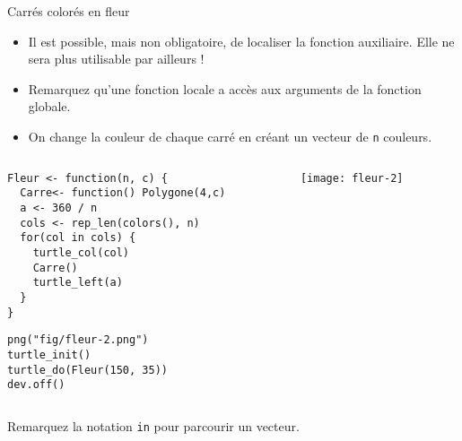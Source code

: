 \documentclass[10pt]{beamer}
\begin{document}
\begin{frame}[fragile]{Carrés colorés en fleur}

  \begin{itemize}
  \item Il est possible, mais non obligatoire, de \alert{localiser la fonction auxiliaire}. Elle ne sera plus utilisable par ailleurs !
  \item Remarquez qu'une fonction locale a accès aux arguments de la fonction globale.
  \item On change la couleur de chaque carré en créant un vecteur de \texttt{n} couleurs.

  \end{itemize}
\begin{columns}[c]
\begin{column}{0.58\textwidth}
  \begin{lstlisting}[style=editor]
Fleur <- function(n, c) {
  Carre<- function() Polygone(4,c)
  a <- 360 / n
  cols <- rep_len(colors(), n)
  for(col in cols) {
    turtle_col(col)
    Carre()
    turtle_left(a)
  }
}
\end{lstlisting}

\begin{lstlisting}[linerange=2-3]
png("fig/fleur-2.png")
turtle_init()
turtle_do(Fleur(150, 35))
dev.off()
\end{lstlisting}
\end{column}

\begin{column}{0.38\textwidth}
    \texttt{[image: fleur-2]}
\end{column}
\end{columns}

Remarquez la notation \lstinline!in! pour parcourir un vecteur.
\end{frame}
\end{document}
